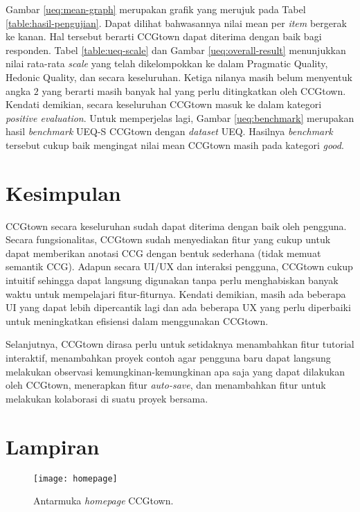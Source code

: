 Gambar \ref{ueq:mean-graph} merupakan grafik yang merujuk pada Tabel \ref{table:hasil-pengujian}.
Dapat dilihat bahwasannya nilai mean per \textit{item} bergerak ke kanan. Hal tersebut berarti
CCGtown dapat diterima dengan baik bagi responden. Tabel \ref{table:ueq-scale} dan Gambar
\ref{ueq:overall-result} menunjukkan nilai rata-rata \textit{scale} yang telah dikelompokkan
ke dalam Pragmatic Quality, Hedonic Quality, dan secara keseluruhan. Ketiga nilanya masih belum
menyentuk angka $2$ yang berarti masih banyak hal yang perlu ditingkatkan oleh CCGtown.
Kendati demikian, secara keseluruhan CCGtown masuk ke dalam kategori \textit{positive evaluation}.
Untuk memperjelas lagi, Gambar \ref{ueq:benchmark} merupakan hasil \textit{benchmark} UEQ-S
CCGtown dengan \textit{dataset} UEQ. Hasilnya \textit{benchmark} tersebut cukup baik mengingat
nilai mean CCGtown masih pada kategori \textit{good}.

   
\section{Kesimpulan}

CCGtown secara keseluruhan sudah dapat diterima dengan baik oleh pengguna. Secara fungsionalitas,
CCGtown sudah menyediakan fitur yang cukup untuk dapat memberikan anotasi CCG dengan bentuk
sederhana (tidak memuat semantik CCG). Adapun secara UI/UX dan interaksi pengguna, CCGtown
cukup intuitif sehingga dapat langsung digunakan tanpa perlu menghabiskan banyak waktu untuk
mempelajari fitur-fiturnya. Kendati demikian, masih ada beberapa UI yang dapat lebih dipercantik
lagi dan ada beberapa UX yang perlu diperbaiki untuk meningkatkan efisiensi dalam menggunakan
CCGtown.

Selanjutnya, CCGtown dirasa perlu untuk setidaknya menambahkan fitur tutorial interaktif,
menambahkan proyek contoh agar pengguna baru dapat langsung melakukan observasi
kemungkinan-kemungkinan apa saja yang dapat dilakukan oleh CCGtown, menerapkan fitur
\textit{auto-save}, dan menambahkan fitur untuk melakukan kolaborasi di suatu proyek bersama.
 





\section*{Lampiran}

\begin{figure}[b]\centering
  \texttt{[image: homepage]}
  \caption{Antarmuka \textit{homepage} CCGtown.}
  \label{ui:homepage}
\end{figure}

